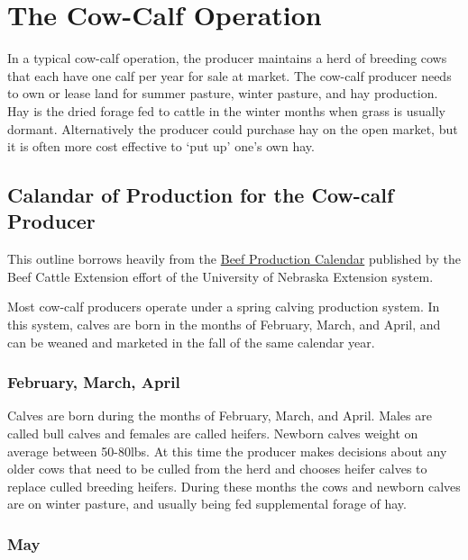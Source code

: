 \documentclass[
]{book}
\begin{document}
\hypertarget{the-cow-calf-operation}{%
\section{The Cow-Calf Operation}\label{the-cow-calf-operation}}

In a typical cow-calf operation, the producer maintains a herd of breeding cows that each have one calf per year for sale at market. The cow-calf producer needs to own or lease land for summer pasture, winter pasture, and hay production. Hay is the dried forage fed to cattle in the winter months when grass is usually dormant. Alternatively the producer could purchase hay on the open market, but it is often more cost effective to `put up' one's own hay.

\hypertarget{calandar-of-production-for-the-cow-calf-producer}{%
\subsection{Calandar of Production for the Cow-calf Producer}\label{calandar-of-production-for-the-cow-calf-producer}}

This outline borrows heavily from the \href{http://beef.unl.edu/beefprodcal.shtml}{Beef Production Calendar} published by the Beef Cattle Extension effort of the University of Nebraska Extension system.

Most cow-calf producers operate under a spring calving production system. In this system, calves are born in the months of February, March, and April, and can be weaned and marketed in the fall of the same calendar year.

\hypertarget{february-march-april}{%
\subsubsection{February, March, April}\label{february-march-april}}

Calves are born during the months of February, March, and April. Males are called bull calves and females are called heifers. Newborn calves weight on average between 50-80lbs. At this time the producer makes decisions about any older cows that need to be culled from the herd and chooses heifer calves to replace culled breeding heifers. During these months the cows and newborn calves are on winter pasture, and usually being fed supplemental forage of hay.

\hypertarget{may}{%
\subsubsection{May}\label{may}}
\end{document}
